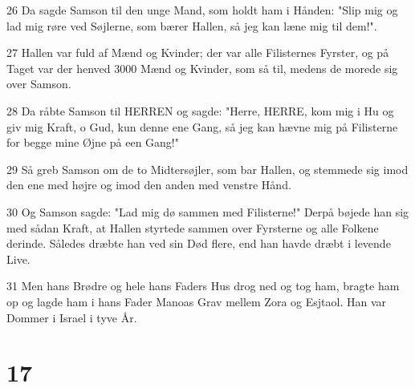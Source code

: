 \par 26 Da sagde Samson til den unge Mand, som holdt ham i Hånden: "Slip mig og lad mig røre ved Søjlerne, som bærer Hallen, så jeg kan læne mig til dem!".
\par 27 Hallen var fuld af Mænd og Kvinder; der var alle Filisternes Fyrster, og på Taget var der henved 3000 Mænd og Kvinder, som så til, medens de morede sig over Samson.
\par 28 Da råbte Samson til HERREN og sagde: "Herre, HERRE, kom mig i Hu og giv mig Kraft, o Gud, kun denne ene Gang, så jeg kan hævne mig på Filisterne for begge mine Øjne på een Gang!"
\par 29 Så greb Samson om de to Midtersøjler, som bar Hallen, og stemmede sig imod den ene med højre og imod den anden med venstre Hånd.
\par 30 Og Samson sagde: "Lad mig dø sammen med Filisterne!" Derpå bøjede han sig med sådan Kraft, at Hallen styrtede sammen over Fyrsterne og alle Folkene derinde. Således dræbte han ved sin Død flere, end han havde dræbt i levende Live.
\par 31 Men hans Brødre og hele hans Faders Hus drog ned og tog ham, bragte ham op og lagde ham i hans Fader Manoas Grav mellem Zora og Esjtaol. Han var Dommer i Israel i tyve År.

\chapter{17}

